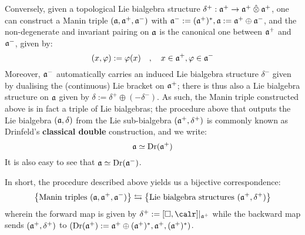 Conversely, given a topological Lie bialgebra structure $\delta^+: \a^+ \to \a^+ \hattensor \a^+$, one can construct a Manin triple $(\mathfrak{a}, \mathfrak{a}^+, \mathfrak{a}^-)$ with $\mathfrak{a}^- := (\mathfrak{a}^+)^*, \mathfrak{a} := \mathfrak{a}^+ \oplus \mathfrak{a}^-$, and the non-degenerate and invariant pairing on $\mathfrak{a}$ is the canonical one between $\mathfrak{a}^+$ and $\mathfrak{a}^-$, given by:
    $$(x, \varphi) := \varphi(x) \quad, \quad x \in \mathfrak{a}^+, \varphi \in \mathfrak{a}^-$$
Moreover, $\mathfrak{a}^-$ automatically carries an induced Lie bialgebra structure $\delta^-$ given by dualising the (continuous) Lie bracket on $\mathfrak{a}^+$; there is thus also a Lie bialgebra structure on $\mathfrak{a}$ given by $\delta := \delta^+ \oplus (-\delta^-)$. As such, the Manin triple constructed above is in fact a triple of Lie bialgebras; the procedure above that outputs the Lie bialgebra $(\mathfrak{a}, \delta)$ from the Lie sub-bialgebra $(\mathfrak{a}^+, \delta^+)$ is commonly known as Drinfeld's \textbf{classical double} construction, and we write:
    $$\mathfrak{a} \simeq \operatorname{Dr}(\mathfrak{a}^+)$$
It is also easy to see that $\mathfrak{a} \simeq \operatorname{Dr}(\mathfrak{a}^-)$.

In short, the procedure described above yields us a bijective correspondence:
    \begin{equation} \label{equation: manin_triple_lie_bialgebra_correspondence}
        \left\{ \text{Manin triples $(\mathfrak{a}, \mathfrak{a}^+, \mathfrak{a}^-)$} \right\} \leftrightarrows \left\{ \text{Lie bialgebra structures $(\mathfrak{a}^+, \delta^+)$} \right\}
    \end{equation}
wherein the forward map is given by $\delta^+ := [\Box, \calr]|_{\a^+}$ while the backward map sends $(\mathfrak{a}^+, \delta^+)$ to $(\operatorname{Dr}(\mathfrak{a}^+) := \mathfrak{a}^+ \oplus (\mathfrak{a}^+)^*, \mathfrak{a}^+, (\mathfrak{a}^+)^*)$.